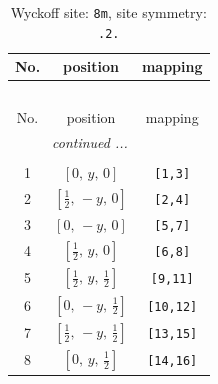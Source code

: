 \documentclass[fleqn,8pt]{jsarticle}
\begin{document}
\renewcommand{\arraystretch}{1.2}
\begin{longtable}{ccc}
\caption{Wyckoff site: {\tt 8m}, site symmetry: {\tt .2.}}
 \\
 \hline \hline
No. & position & mapping \\ \hline \endfirsthead

\multicolumn{2}{l}{\tablename\ \thetable{}} \\
 \hline \hline
No. & position & mapping \\ \hline \endhead

 \hline \hline
\multicolumn{2}{r}{\footnotesize\it continued ...} \\ \endfoot

 \hline \hline
\multicolumn{2}{r}{} \\ \endlastfoot

1 & $\left[ 0,\, y,\, 0 \right]$ & {\tt [1,3]} \\ \hline
2 & $\left[ \frac{1}{2},\, - y,\, 0 \right]$ & {\tt [2,4]} \\ \hline
3 & $\left[ 0,\, - y,\, 0 \right]$ & {\tt [5,7]} \\ \hline
4 & $\left[ \frac{1}{2},\, y,\, 0 \right]$ & {\tt [6,8]} \\ \hline
5 & $\left[ \frac{1}{2},\, y,\, \frac{1}{2} \right]$ & {\tt [9,11]} \\ \hline
6 & $\left[ 0,\, - y,\, \frac{1}{2} \right]$ & {\tt [10,12]} \\ \hline
7 & $\left[ \frac{1}{2},\, - y,\, \frac{1}{2} \right]$ & {\tt [13,15]} \\ \hline
8 & $\left[ 0,\, y,\, \frac{1}{2} \right]$ & {\tt [14,16]} \\
\end{longtable}
\renewcommand{\arraystretch}{1.2}
\end{document}
